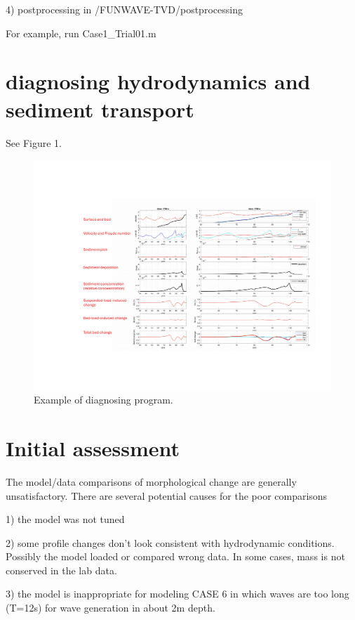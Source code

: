 \documentclass[preprint,10pt]{elsarticle}
\begin{document}
 4) postprocessing in  /FUNWAVE-TVD/postprocessing

For example, run Case1\_Trial01.m


\section*{diagnosing hydrodynamics and sediment transport}

See Figure 1. 

 \begin{figure}
\begin{center}
 \includegraphics[width=1.0\textwidth]{diagnose.pdf}
 \caption{Example of diagnosing program. }
 \label{lineargrid}
 \end{center}
 \end{figure}

\section*{Initial assessment}  

The model/data comparisons of morphological change are generally unsatisfactory. There are several potential causes for the poor comparisons

1) the model was not tuned 

2) some profile changes don't look consistent with hydrodynamic conditions. Possibly the model loaded or compared wrong data. In some cases, mass is not conserved in the lab data. 

3) the model is inappropriate for modeling CASE 6 in which waves are too long (T=12s) for wave generation in about 2m depth.  
\end{document}
